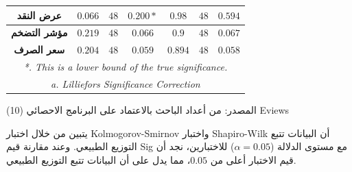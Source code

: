 \documentclass[10pt,a4paper]{report}
\begin{document}
\begin{doublespacing}
\begin{table}[H]
\begin{tabular}{@{}|ccccccc|@{}}
			\multicolumn{1}{|c|}{\textbf{عرض النقد}} &
			\multicolumn{1}{c|}{$0.066$} &
			\multicolumn{1}{c|}{$48$} &
			\multicolumn{1}{c|}{$0.200*$} &
			\multicolumn{1}{c|}{$0.98$} &
			\multicolumn{1}{c|}{$48$} &
			$0.594$ \\ \midrule
			\multicolumn{1}{|c|}{\textbf{مؤشر التضخم}} &
			\multicolumn{1}{c|}{$0.219$} &
			\multicolumn{1}{c|}{$48$} &
			\multicolumn{1}{c|}{$0.066$} &
			\multicolumn{1}{c|}{$0.9$} &
			\multicolumn{1}{c|}{$48$} &
			$0.067$ \\ \midrule
			\multicolumn{1}{|c|}{\textbf{سعر الصرف}} &
			\multicolumn{1}{c|}{$0.204$} &
			\multicolumn{1}{c|}{$48$} &
			\multicolumn{1}{c|}{$0.059$} &
			\multicolumn{1}{c|}{$0.894$} &
			\multicolumn{1}{c|}{$48$} &
			$0.058$ \\ \midrule
			\multicolumn{7}{|c|}{\textit{\textenglish{*. This is a   lower bound of the true significance.}}} \\ \midrule
			\multicolumn{7}{|c|}{\textit{\textenglish{a. Lilliefors   Significance Correction}}} \\ \bottomrule
		\end{tabular}%
	\end{table}
المصدر: من أعداد الباحث بالاعتماد على البرنامج الاحصائي (10) Eviews

يتبين من خلال اختبار \textenglish{Kolmogorov-Smirnov} واختبار \textenglish{Shapiro-Wilk} أن البيانات تتبع التوزيع الطبيعي. وعند مقارنة قيم \textenglish{Sig} مع مستوى الدلالة ($\alpha = 0.05$) للاختبارين، نجد أن قيم الاختبار أعلى من $0.05$، مما يدل على أن البيانات تتبع التوزيع الطبيعي.

\end{doublespacing}
\end{document}
